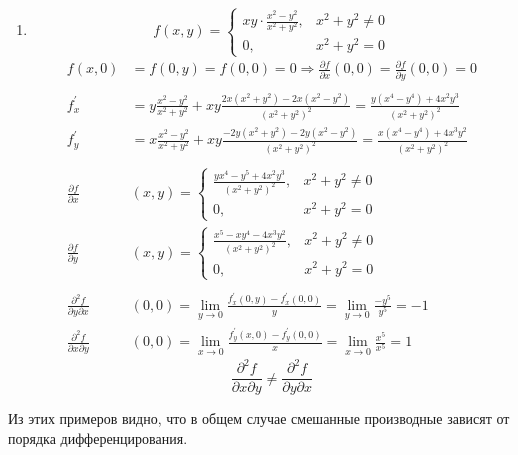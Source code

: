 \documentclass[a4paper,12pt]{article} %
\begin{document}
\begin{enumerate}
		\item 
		\vspace{10mm}
		$$ f(x, y) = 
		\begin{cases*} 
			xy\cdot\frac{x^2-y^2}{x^2+y^2},& \text{$x^2+y^2\neq 0$}\\
			0,& \text{$x^2+y^2= 0$}
		\end{cases*}$$
		\begin{align*}
			f(x, 0) &= f(0, y) = f(0, 0) = 0 \Rightarrow \frac{\partial f}{\partial x}(0, 0) = \frac{\partial f}{\partial y}(0, 0) = 0\\&\\
			f^{'}_{x} &= y\frac{x^2-y^2}{x^2+y^2}+xy\frac{2x(x^2+y^2) - 2x(x^2-y^2)}{(x^2+y^2)^2} = \frac{y(x^4-y^4)+4x^2y^3}{(x^2+y^2)^2}\\
			f^{'}_{y} &= x\frac{x^2-y^2}{x^2+y^2}+xy\frac{-2y(x^2+y^2) - 2y(x^2-y^2)}{(x^2+y^2)^2} = \frac{x(x^4-y^4)+4x^3y^2}{(x^2+y^2)^2}\\&\\
			\frac{\partial f}{\partial x}&(x, y) =
			\begin{cases*}
				\frac{yx^4-y^5+4x^2y^3}{(x^2+y^2)^2}, &\text{$x^2+y^2\neq 0$}\\
				0, &\text{$x^2+y^2=0$}
			\end{cases*}\\
			\frac{\partial f}{\partial y}&(x, y) =
			\begin{cases*}
				\frac{x^5-xy^4-4x^3y^2}{(x^2+y^2)^2}, &\text{$x^2+y^2\neq 0$}\\
				0, &\text{$x^2+y^2=0$}
			\end{cases*}\\&\\
			\frac{\partial^2f}{\partial y\partial x}&(0, 0) = \lim\limits_{y\to 0}\frac{f^{'}_x(0, y) - f^{'}_x(0, 0)}{y} = \lim\limits_{y\to 0}\frac{-y^5}{y^5} = -1\\
			\frac{\partial^2f}{\partial x\partial y}&(0, 0) = \lim\limits_{x\to 0}\frac{f^{'}_y(x, 0) - f^{'}_y(0, 0)}{x} = \lim\limits_{x\to 0}\frac{x^5}{x^5} = 1
		\end{align*}
		\[
		\frac{\partial^2f}{\partial{x}\partial{y}} \neq \frac{\partial^2f}{\partial{y}\partial{x}}
		\]
		\vspace{5mm}
		
	\end{enumerate}
	
	Из этих примеров видно, что в общем случае смешанные производные зависят от порядка дифференцирования.
	\vspace{5mm} 
	
\end{document}
